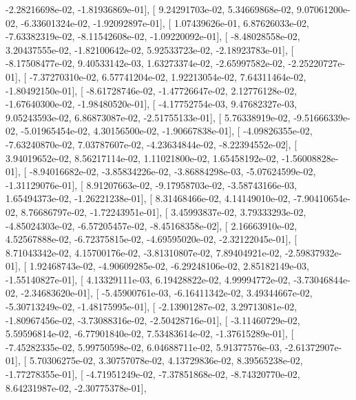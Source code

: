 \documentclass{article}
\begin{document}
         -2.28216698e-02,  -1.81936869e-01],
       [  9.24291703e-02,   5.34669868e-02,   9.07061200e-02,
         -6.33601324e-02,  -1.92092897e-01],
       [  1.07439626e-01,   6.87626033e-02,  -7.63382319e-02,
         -8.11542608e-02,  -1.09220092e-01],
       [ -8.48028558e-02,   3.20437555e-02,  -1.82100642e-02,
          5.92533723e-02,  -2.18923783e-01],
       [ -8.17508477e-02,   9.40533142e-03,   1.63273374e-02,
         -2.65997582e-02,  -2.25220727e-01],
       [ -7.37270310e-02,   6.57741204e-02,   1.92213054e-02,
          7.64311464e-02,  -1.80492150e-01],
       [ -8.61728746e-02,  -1.47726647e-02,   2.12776128e-02,
         -1.67640300e-02,  -1.98480520e-01],
       [ -4.17752754e-03,   9.47682327e-03,   9.05243593e-02,
          6.86873087e-02,  -2.51755133e-01],
       [  5.76338919e-02,  -9.51666339e-02,  -5.01965454e-02,
          4.30156500e-02,  -1.90667838e-01],
       [ -4.09826355e-02,  -7.63240870e-02,   7.03787607e-02,
         -4.23634844e-02,  -8.22394552e-02],
       [  3.94019652e-02,   8.56217114e-02,   1.11021800e-02,
          1.65458192e-02,  -1.56008828e-01],
       [ -8.94016682e-02,  -3.85834226e-02,  -3.86884298e-03,
         -5.07624599e-02,  -1.31129076e-01],
       [  8.91207663e-02,  -9.17958703e-02,  -3.58743166e-03,
          1.65494373e-02,  -1.26221238e-01],
       [  8.31468466e-02,   4.14149010e-02,  -7.90410654e-02,
          8.76686797e-02,  -1.72243951e-01],
       [  3.45993837e-02,   3.79333293e-02,  -4.85024303e-02,
         -6.57205457e-02,  -8.45168358e-02],
       [  2.16663910e-02,   4.52567888e-02,  -6.72375815e-02,
         -4.69595020e-02,  -2.32122045e-01],
       [  8.71043342e-02,   4.15700176e-02,  -3.81310807e-02,
          7.89404921e-02,  -2.59837932e-01],
       [  1.92468743e-02,  -4.90609285e-02,  -6.29248106e-02,
          2.85182149e-03,  -1.55140827e-01],
       [  4.13329111e-03,   6.19428822e-02,   4.99994772e-02,
         -3.73046844e-02,  -2.34683620e-01],
       [ -5.45900761e-03,  -6.16411342e-02,   3.49344667e-02,
         -5.30713249e-02,  -1.48175995e-01],
       [ -2.13901287e-02,   3.29713081e-02,  -1.80967456e-02,
         -3.73088316e-02,  -2.50428716e-01],
       [ -3.11460729e-02,   5.59596814e-02,  -6.77901840e-02,
          7.53483614e-02,  -1.37615289e-01],
       [ -7.45282335e-02,   5.99750598e-02,   6.04688711e-02,
          5.91377576e-03,  -2.61372907e-01],
       [  5.70306275e-02,   3.30757078e-02,   4.13729836e-02,
          8.39565238e-02,  -1.77278355e-01],
       [ -4.71951249e-02,  -7.37851868e-02,  -8.74320770e-02,
          8.64231987e-02,  -2.30775378e-01],
\end{document}

